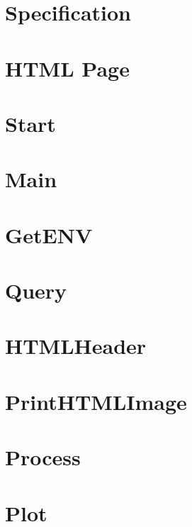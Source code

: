 \documentclass{article}
\begin{document}
\section*{Specification}


\newpage\section*{HTML Page}


\newpage\section*{Start}


\newpage\section*{Main}


\newpage\section*{GetENV}


\newpage\section*{Query}


\newpage\section*{HTMLHeader}


\newpage\section*{PrintHTMLImage}


\newpage\section*{Process}


\newpage\section*{Plot}

\end{document}
